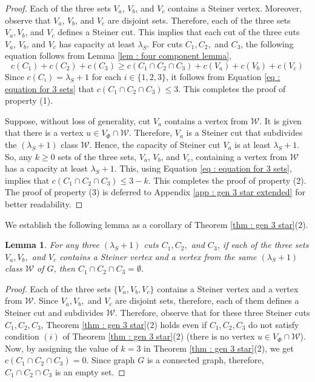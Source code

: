 \documentclass[letterpaper,11pt]{article}
\newtheorem{lemma}{Lemma}[]
\begin{document}
\begin{proof}
Each of the three sets $V_a$, $V_b$, and $V_c$ contains a Steiner vertex. Moreover, observe that $V_a$, $V_b$, and $V_c$ are disjoint sets. Therefore, each of the three sets $V_a, V_b$, and $V_c$ defines a Steiner cut. 
This implies that each cut of the three cuts $V_a$, $V_b$, and $V_c$ has capacity at least $\lambda_S$. For cuts $C_1,C_2,$ and $C_3$, the following equation follows from Lemma \ref{lem : four component lemma}, 
\begin{equation} \label{eq : equation for 3 sets}
c(C_1)+c(C_2)+c(C_3)\ge c(C_1\cap C_2 \cap C_3) + c(V_a) + c(V_b) + c(V_c)
\end{equation} 
Since $c(C_i)= \lambda_S+1$ for each $i\in \{1,2,3\}$, it follows from Equation \ref{eq : equation for 3 sets} that $c(C_1\cap C_2 \cap C_3)\le 3$. This completes the proof of property (1). 

Suppose, without loss of generality, cut $V_a$ contains a vertex from ${\mathcal W}$. It is given that there is a vertex $u\in V_{\Phi}\cap {\mathcal W}$. Therefore, $V_a$ is a Steiner cut that subdivides the $(\lambda_S+1)$ class ${\mathcal W}$. Hence, the capacity of Steiner cut $V_a$ is at least $\lambda_S+1$. So, any $k\ge 0$ sets of the three sets, $V_a$, $V_b$, and $V_c$, containing a vertex from ${\mathcal W}$ has a capacity at least $\lambda_S+1$. This, using Equation \ref{eq : equation for 3 sets}, implies that $c(C_1\cap C_2\cap C_3)\le 3-k$. This completes the proof of property (2). The proof of property (3) is deferred to  Appendix \ref{app : gen 3 star extended} for better readability.
\end{proof}

We establish the following lemma as a corollary of Theorem \ref{thm : gen 3 star}(2).

\begin{lemma} \label{lem : cor of gen 3 star}
    For any three $(\lambda_S+1)$ cuts $C_1,C_2,$ and $C_3$, if each of the three sets $V_a, V_b,$ and $V_c$ contains a Steiner vertex and a vertex from the same $(\lambda_S+1)$ class ${\mathcal W}$ of $G$, then $C_1\cap C_2 \cap C_3=\emptyset$.
\end{lemma}
\begin{proof}
    Each of the three sets $\{V_a,V_b,V_c\}$ contains a Steiner vertex and a vertex from ${\mathcal W}$. Since $V_a,V_b,$ and $V_c$ are disjoint sets, therefore, each of them defines a Steiner cut and subdivides ${\mathcal W}$. Therefore, observe that for these three Steiner cuts $C_1,C_2,C_3$, Theorem \ref{thm : gen 3 star}(2) holds even if $C_1,C_2,C_3$ do not satisfy condition $(i)$ of Theorem \ref{thm : gen 3 star}(2) (there is no vertex $u\in V_{\Phi}\cap {\mathcal W}$). Now, by assigning the value of $k=3$ in Theorem \ref{thm : gen 3 star}(2), we get $c(C_1\cap C_2\cap C_3)=0$. Since graph $G$ is a connected graph, therefore, $C_1\cap C_2 \cap C_3$ is an empty set. 
\end{proof}
\end{document}
